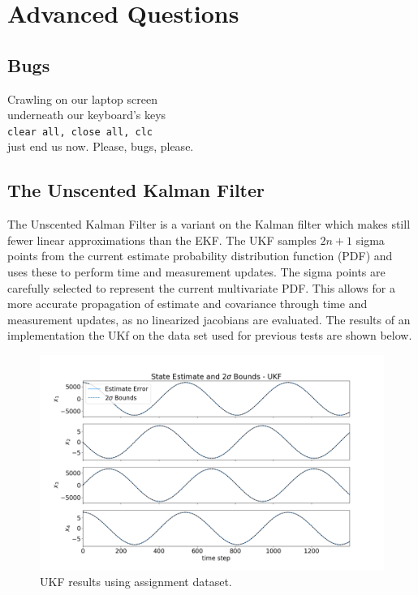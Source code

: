 \documentclass[11pt, a4paper]{article}
\begin{document}
\newpage

\section*{Advanced Questions}
\subsection{Bugs}
Crawling on our laptop screen \\
underneath our keyboard's keys \\
\texttt{clear all, close all, clc} \\
just end us now. Please, bugs, please. \\
 
\subsection{The Unscented Kalman Filter}
The Unscented Kalman Filter is a variant on the Kalman filter which makes still fewer linear approximations than the EKF. 
The UKF samples $2n+1$ sigma points from the current estimate probability distribution function (PDF) and uses these to perform time and measurement updates.
The sigma points are carefully selected to represent the current multivariate PDF. 
This allows for a more accurate propagation of estimate and covariance through time and measurement updates, as no linearized jacobians are evaluated. 
The results of an implementation the UKf on the data set used for previous tests are shown below.

\begin{figure}[H]
	\centering
	\includegraphics[width=\textwidth]{Figures/ukf_dataset_est.png}
	\caption{UKF results using assignment dataset.}
	\label{fig:ukf_dataset}
\end{figure}
\end{document}
